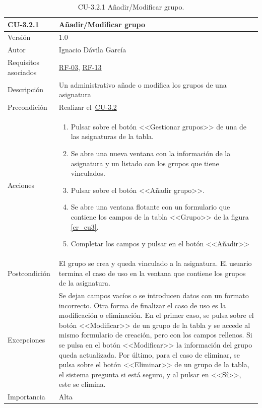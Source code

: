 \begin{table}[p]
	\centering
	\begin{tabularx}{\linewidth}{ p{} p{} }
		\toprule
		\textbf{CU-3.2.1}    & \textbf{Añadir/Modificar grupo}\\
		\toprule
		{\small Versión}              & 1.0    \\
		{\small Autor}                & Ignacio Dávila García \\
		{\small Requisitos asociados} & \hyperref[itm:RF3]{RF-03}, \hyperref[itm:RF13]{RF-13} \\
		{\small Descripción}          & Un administrativo añade o modifica los grupos de una asignatura \\
		{\small Precondición}         & Realizar el~\hyperref[table:CU-3_2]{CU-3.2} \\
		{\small Acciones}             &
		\begin{enumerate}
			\def\labelenumi{\arabic{enumi}.}
			\tightlist
			\item Pulsar sobre el botón <<Gestionar grupos>> de una de las asignaturas de la tabla.
			\item Se abre una nueva ventana con la información de la asignatura y un listado con los grupos que tiene vinculados.
			\item Pulsar sobre el botón <<Añadir grupo>>.
			\item Se abre una ventana flotante con un formulario que contiene los campos de la tabla <<Grupo>> de la figura \ref{er_cu3}.
			\item Completar los campos y pulsar en el botón <<Añadir>>
		\end{enumerate}\\
		{\small Postcondición}        & El grupo se crea y queda vinculado a la asignatura. El usuario termina el caso de uso en la ventana que contiene los grupos de la asignatura. \\
		{\small Excepciones}          & Se dejan campos vacíos o se introducen datos con un formato incorrecto. Otra forma de finalizar el caso de uso es la modificación o eliminación. En el primer caso, se pulsa sobre el botón <<Modificar>> de un grupo de la tabla y se accede al mismo formulario de creación, pero con los campos rellenos. Si se pulsa en el botón <<Modificar>> la información del grupo queda actualizada. Por último, para el caso de eliminar, se pulsa sobre el botón <<Eliminar>> de un grupo de la tabla, el sistema pregunta si está seguro, y al pulsar en <<Sí>>, este se elimina. \\
		{\small Importancia}          & Alta \\
		\bottomrule
	\end{tabularx}
	\caption{CU-3.2.1 Añadir/Modificar grupo.}\label{table:CU-3_2_1}
\end{table}
\FloatBarrier


